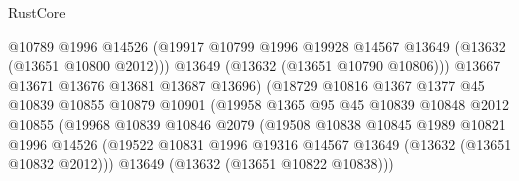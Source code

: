 \begin{lexlean}{RustCore}
\begin{coremodule}
                                      @10789
                                      @1996
                                      @14526
                                      (@19917
                                        @10799
                                        @1996
                                        @19928
                                        @14567
                                        @13649
                                        (@13632 (@13651 @10800 @2012)))
                                      @13649
                                      (@13632 (@13651 @10790 @10806)))
                                    @13667
                                    @13671
                                    @13676
                                    @13681
                                    @13687
                                    @13696)
                                  (@18729
                                    @10816
                                    @1367
                                    @1377
                                    @45
                                    @10839
                                    @10855
                                    @10879
                                    @10901
                                    (@19958
                                      @1365
                                      @95
                                      @45
                                      @10839
                                      @10848
                                      @2012
                                      @10855
                                      (@19968
                                        @10839
                                        @10846
                                        @2079
                                        (@19508
                                          @10838
                                          @10845
                                          @1989
                                          @10821
                                          @1996
                                          @14526
                                          (@19522
                                            @10831
                                            @1996
                                            @19316
                                            @14567
                                            @13649
                                            (@13632 (@13651 @10832 @2012)))
                                          @13649
                                          (@13632 (@13651 @10822 @10838)))

\end{coremodule}
\end{lexlean}
